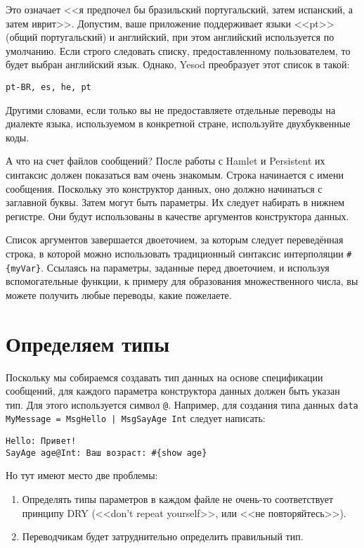 Это означает <<я предпочел бы бразильский португальский, затем испанский, а затем иврит>>. Допустим, ваше приложение поддерживает языки <<pt>> (общий португальский) и английский, при этом английский используется по умолчанию. Если строго следовать списку, предоставленному пользователем, то будет выбран английский язык. Однако, Yesod преобразует этот список в такой:

\begin{lstlisting}
pt-BR, es, he, pt
\end{lstlisting}

Другими словами, если только вы не предоставляете отдельные переводы на диалекте языка, используемом в конкретной стране, используйте двухбуквенные коды.

А что на счет файлов сообщений? После работы с Hamlet и Persistent их синтаксис должен показаться вам очень знакомым. Строка начинается с имени сообщения. Поскольку это конструктор данных, оно должно начинаться с заглавной буквы. Затем могут быть параметры. Их следует набирать в нижнем регистре. Они будут использованы в качестве аргументов конструктора данных.

Список аргументов завершается двоеточием, за которым следует переведённая строка, в которой можно использовать традиционный синтаксис интерполяции \lstinline'#{myVar}'. Ссылаясь на параметры, заданные перед двоеточием, и используя вспомогательные функции, к примеру для образования множественного числа, вы можете получить любые переводы, какие пожелаете.

\section{Определяем типы} %

Поскольку мы собираемся создавать тип данных на основе спецификации сообщений, для каждого параметра конструктора данных должен быть указан тип. Для этого используется символ \verb'@'. Например, для создания типа данных \lstinline'data MyMessage = MsgHello | MsgSayAge Int' следует написать:

\begin{lstlisting}
Hello: Привет!
SayAge age@Int: Ваш возраст: #{show age}
\end{lstlisting}

Но тут имеют место две проблемы:

\begin{enumerate}
  \item Определять типы параметров в каждом файле не очень-то соответствует принципу DRY (<<don't repeat yourself>>, или <<не повторяйтесь>>).
  \item Переводчикам будет затруднительно определить правильный тип.
\end{enumerate}


